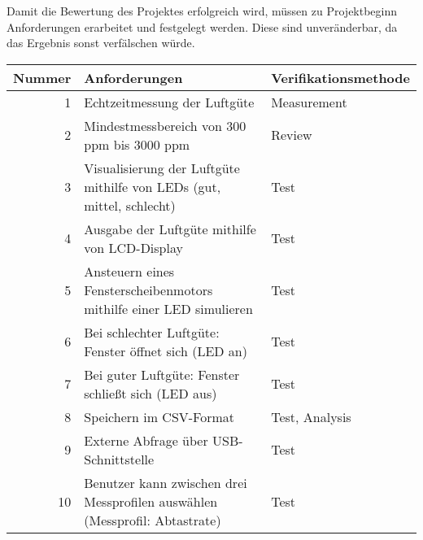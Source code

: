 \label{Anforderungen}

Damit die Bewertung des Projektes erfolgreich wird, müssen zu Projektbeginn Anforderungen erarbeitet und festgelegt werden. Diese sind unveränderbar, da das Ergebnis sonst verfälschen würde. \\


\begin{table}[!hbt]
	
	\centering
	
	\begin{tabular}{|r| p{8.4cm}|p{4.7cm}|}
		
		\hline
		Nummer & Anforderungen & Verifikationsmethode \\
		\hline
		1 & Echtzeitmessung der Luftgüte & Measurement \\
		\hline
		2 & Mindestmessbereich von 300 ppm bis 3000 ppm & Review \\
		\hline
		3 & Visualisierung der Luftgüte mithilfe von LEDs (gut, mittel, schlecht) & Test \\
		\hline
		4 & Ausgabe der Luftgüte mithilfe von LCD-Display & Test \\
		\hline
		5 & Ansteuern eines Fensterscheibenmotors mithilfe einer LED simulieren & Test \\
		\hline
		6 & Bei schlechter Luftgüte: Fenster öffnet sich (LED an) & Test \\
		\hline
		7 & Bei guter Luftgüte: Fenster schließt sich (LED aus) & Test \\
		\hline
		8 & Speichern im CSV-Format & Test, Analysis\\
		\hline
		9 & Externe Abfrage über USB-Schnittstelle & Test \\
		\hline
		10 & Benutzer kann zwischen drei Messprofilen auswählen (Messprofil: Abtastrate) & Test \\
		\hline
		
	\end{tabular}

\label{tab:Anforderungen}

\end{table}